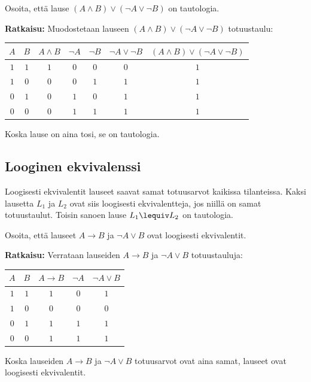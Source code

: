 \begin{esimerkki}
Osoita, että lause $(A\land B)\lor (\lnot A \lor \lnot B)$ on
tautologia.

{\bf Ratkaisu:}
Muodostetaan lauseen $(A\land B)\lor (\lnot A \lor \lnot
B)$ totuustaulu:

\begin{center}
\begin{tabular}{|c|c|c|c|c|c|c|}\hline
$A$ & $B$ & $A\land B$ & $\lnot A$ & $\lnot B$ & $ \lnot
A \lor \lnot B $ & $(A\land B)\lor (\lnot A \lor \lnot B)$
\\ \hline
$1$ & $1$ & $1$ & $0$ & $0$ & $0$ & $1$ \\ %
$1$ & $0$ & $0$ & $0$ & $1$ & $1$ & $1$ \\
$0$ & $1$ & $0$ & $1$ & $0$ & $1$ & $1$ \\
$0$ & $0$ & $0$ & $1$ & $1$ & $1$ & $1$ \\ \hline
\end{tabular}
\end{center}

Koska lause on aina tosi, se on tautologia.
\end{esimerkki}

\subsection*{Looginen ekvivalenssi}  Loogisesti
ekvivalentit lauseet saavat samat totuusarvot
kaikissa tilanteissa. Kaksi lausetta $L_1$ ja
$L_2$ ovat siis  loogisesti ekvivalentteja, jos niillä
on samat totuustaulut. Toisin sanoen lause $L_1 \lequiv L_2$ on tautologia.

\begin{esimerkki}
 Osoita, että lauseet $A\to B$ ja $\lnot A \lor B$ ovat loogisesti
ekvivalentit.

{\bf Ratkaisu:}
Verrataan lauseiden $A\to B$ ja $\lnot A \lor B$
totuustauluja: 

\begin{center}
\begin{tabular}{|c|c|c|c|c|}\hline
$A$ & $B$ & $A\to B$ & $\lnot A$ & $\lnot A\lor B$ \\ \hline
$1$ & $1$ & $1$ & $0$ & $1$  \\ %
$1$ & $0$ & $0$ & $0$ & $0$  \\
$0$ & $1$ & $1$ & $1$ & $1$  \\
$0$ & $0$ & $1$ & $1$ & $1$  \\ \hline
\end{tabular}
\end{center}

Koska lauseiden $A\to B$ ja $\lnot A \lor B$ totuusarvot
ovat aina samat, lauseet ovat loogisesti ekvivalentit.
\end{esimerkki}


